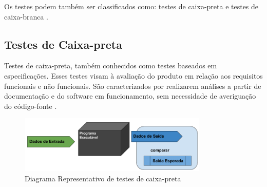 \par
\indent Os testes podem também ser classificados como: testes de caixa-preta e
testes de caixa-branca \cite{barbosaEtAl2009}.

\subsection{Testes de Caixa-preta}
Testes de caixa-preta, também conhecidos como testes baseados em
especificações. Esses testes visam à avaliação do produto em relação aos
requisitos funcionais e não funcionais. São caracterizados por realizarem
análises a partir de documentação e do software em funcionamento, sem
necessidade de averiguação do código-fonte \cite{barbosaEtAl2009}.

\begin{figure}[h]
  \centering
    \includegraphics[width=0.8\textwidth]{figuras/test_black_box.png}
    \caption{Diagrama Representativo de testes de caixa-preta}
    \label{test_black_box}
\end{figure}


